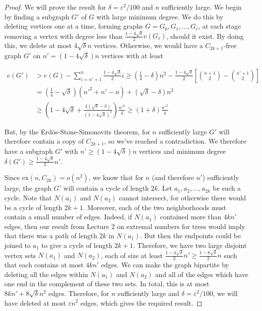 \documentclass[12pt]{article}
\newcommand{\ex}{\mathrm{ex}}
\begin{document}
\begin{proof}
	We will prove the result for $\delta=\varepsilon^2/100$ and $n$ sufficiently large. We begin by finding a subgraph $G'$ of $G$ with large minimum degree. We do this by deleting vertices one at a time, forming graphs $G=G_0, G_1, \dots, G_\ell$, at each stage removing a vertex with degree less than $\frac{1-4\sqrt{\delta}}{2} v(G_\ell)$, should it exist. By doing this, we delete at most $4\sqrt{\delta} n$ vertices. Otherwise, we would have a $C_{2k+1}$-free graph $G'$ on $n'=(1-4\sqrt{\delta})n$ vertices with at least

	$$\begin{aligned}
		e(G') &> e(G)-\sum_{i=n'+1}^{n} \frac{1-4\sqrt{\delta}}{2} i \geq \left(\frac{1}{4}-\delta\right)n^2-\frac{1-4\sqrt{\delta}}{2}\left[\binom{n+1}{2}-\binom{n'+1}{2}\right]\\
		&= \left(\frac{1}{4}-\sqrt{\delta}\right)(n'^2+n'-n)+(\sqrt{\delta}-\delta)n^2\\
		&\geq \left(1-4\sqrt{\delta}+\frac{4(\sqrt{\delta}-\delta)}{(1-4\sqrt{\delta})^2}\right)\frac{n'^2}{4}\geq (1+\delta)\frac{n'^2}{4}
	\end{aligned}$$

	But, by the Erd\"os-Stone-Simonovits theorem, for $n$ sufficiently large $G'$ will therefore contain a copy of $C_{2k+1}$, so we've reached a contradiction. We therefore have a subgraph $G'$ with $n'\geq (1-4\sqrt{\delta})n$ vertices and minimum degree $\delta(G')\geq \frac{1-4\sqrt{\delta}}{2}n'$.

	Since $\ex(n, C_{2k}) = o(n^2)$, we know that for $n$ (and therefore $n'$) sufficiently large, the graph $G'$ will contain a cycle of length $2k$. Let $a_1, a_2 ,\dots, a_{2k}$ be such a cycle. Note that $N(a_1)$ and $N(a_2)$ cannot intersect, for otherwise there would be a cycle of length $2k+1$. Moreover, each of the two neighborhoods must contain a small number of edges. Indeed, if $N(a_1)$ contained more than $4kn'$ edges, then our result from Lecture 2 on extremal numbers for trees would imply that there was a path of length $2k$ in $N(a_1)$. But then the endpoints could be joined to $a_1$ to give a cycle of length $2k+1$. Therefore, we have two large disjoint vertex sets $N(a_1)$ and $N(a_2)$, each of size at least $\frac{1-4\sqrt{\delta}}{2}n'\geq \frac{1-8\sqrt{\delta}}{2}n$ such that each contains at most $4kn'$ edges. We can make the graph bipartite by deleting all the edges within $N(a_1)$ and $N(a_2)$ and all of the edges which have one end in the complement of these two sets. In total, this is at most $8kn' + 8\sqrt{\delta}n^2$ edges. Therefore, for $n$ sufficiently large and $\delta=\varepsilon^2/100$, we will have deleted at most $\varepsilon n^2$ edges, which gives the required result.
\end{proof}
\end{document}
